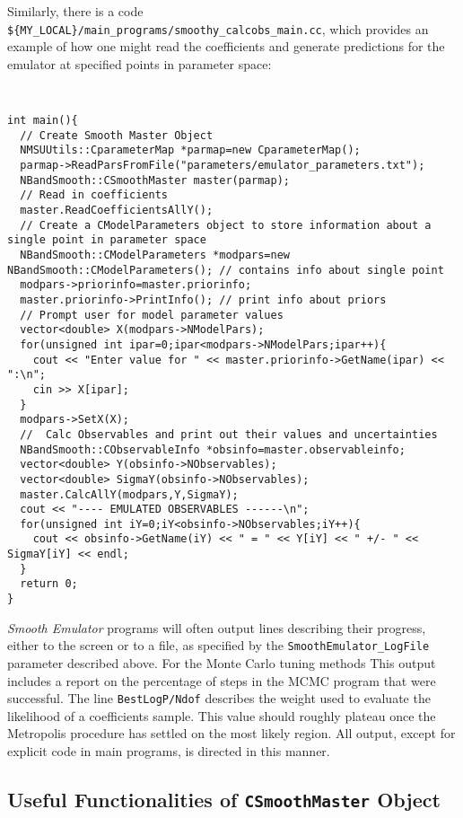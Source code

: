 \documentclass[UserManual.tex]{subfiles}
\begin{document}
Similarly, there is a code {\tt \$\{MY\_LOCAL\}/main\_programs/smoothy\_calcobs\_main.cc}, which provides an example of how one might read the coefficients and generate predictions for the emulator at specified points in parameter space:
{\tt
\begin{verbatim}
int main(){
  // Create Smooth Master Object
  NMSUUtils::CparameterMap *parmap=new CparameterMap();
  parmap->ReadParsFromFile("parameters/emulator_parameters.txt");
  NBandSmooth::CSmoothMaster master(parmap);
  // Read in coefficients
  master.ReadCoefficientsAllY();
  // Create a CModelParameters object to store information about a single point in parameter space
  NBandSmooth::CModelParameters *modpars=new NBandSmooth::CModelParameters(); // contains info about single point
  modpars->priorinfo=master.priorinfo;
  master.priorinfo->PrintInfo(); // print info about priors
  // Prompt user for model parameter values
  vector<double> X(modpars->NModelPars);
  for(unsigned int ipar=0;ipar<modpars->NModelPars;ipar++){
    cout << "Enter value for " << master.priorinfo->GetName(ipar) << ":\n";
    cin >> X[ipar];
  }
  modpars->SetX(X);
  //  Calc Observables and print out their values and uncertainties
  NBandSmooth::CObservableInfo *obsinfo=master.observableinfo;
  vector<double> Y(obsinfo->NObservables);
  vector<double> SigmaY(obsinfo->NObservables);
  master.CalcAllY(modpars,Y,SigmaY);
  cout << "---- EMULATED OBSERVABLES ------\n";
  for(unsigned int iY=0;iY<obsinfo->NObservables;iY++){
    cout << obsinfo->GetName(iY) << " = " << Y[iY] << " +/- " << SigmaY[iY] << endl;
  }
  return 0;
}
\end{verbatim}
}

{\it Smooth Emulator} programs will often output lines describing their progress, either to the screen or to a file, as specified by the {\tt SmoothEmulator\_LogFile} parameter described above. For the Monte Carlo tuning methods This output includes a report on the percentage of steps in the MCMC program that were successful. The line {\tt BestLogP/Ndof} describes the weight used to evaluate the likelihood of a coefficients sample. This value should roughly plateau once the Metropolis procedure has settled on the most likely region. All output, except for explicit code in main programs, is directed in this manner. 

\subsection{Useful Functionalities of {\tt CSmoothMaster} Object}
\end{document}
